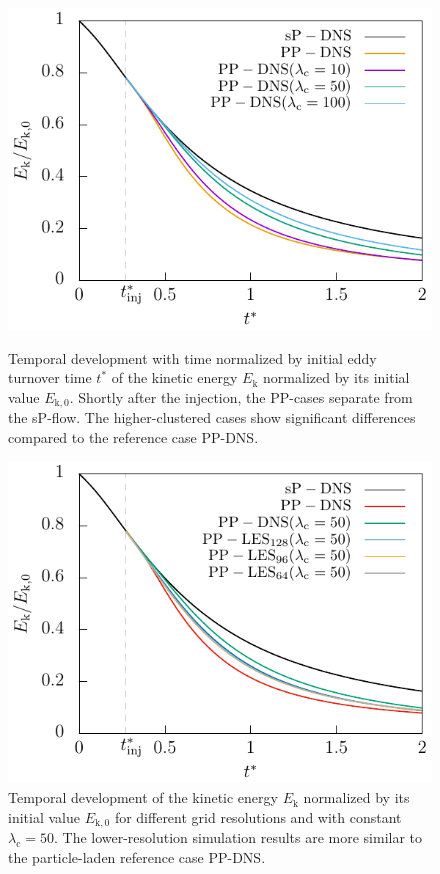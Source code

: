 \documentclass[11pt,a4paper,openany,oneside,parskip=half*]{article}
\begin{document}
    \begin{figure}[]
    \centering
    \begin{minipage}[t]{0.5\textwidth}
        \centering
 	   \includegraphics[width=\linewidth]{./Abbildungen/256/kineticEnergy_time.pdf}
	   \caption{Temporal development with time normalized by initial eddy turnover time $t^*$ of the kinetic energy $E_\mathrm{k}$ normalized by its initial value $E_\mathrm{k,0}$. Shortly after the injection, the PP-cases separate from the sP-flow. The higher-clustered cases show significant differences compared to the reference case PP-DNS.}
	\label{kineticEnergy_time_256}
    \end{minipage}%
\begin{minipage}[t]{0.5\textwidth}
        \centering
        \includegraphics[width=\linewidth]{./Abbildungen/256/kineticEnergy_comp50.pdf}
        \caption{Temporal development of the kinetic energy $E_\mathrm{k}$ normalized by its initial value $E_\mathrm{k,0}$ for different grid resolutions and with constant $\lambda_\mathrm{c}=50$. The lower-resolution simulation results are more similar to the particle-laden reference case PP-DNS.}
        \label{comparison_LES_DNS}
    \end{minipage}
\end{figure}%
\end{document}
